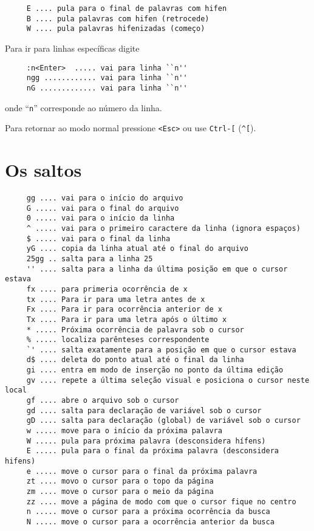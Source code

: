 \begin{verbatim}
     E .... pula para o final de palavras com hifen
     B .... pula palavras com hifen (retrocede)
     W .... pula palavras hifenizadas (começo)
\end{verbatim}



Para ir para linhas específicas digite

\begin{verbatim}
     :n<Enter>  ..... vai para linha ``n''
     ngg ............ vai para linha ``n''
     nG ............. vai para linha ``n''
\end{verbatim}

onde ``\verb|n|'' corresponde ao número da linha.

Para retornar ao modo normal pressione \verb|<Esc>| ou use \verb|Ctrl-[|
(\verb|^[|).

\section{Os saltos}\label{Os saltos}

\begin{verbatim}
     gg .... vai para o início do arquivo
     G ..... vai para o final do arquivo
     0 ..... vai para o início da linha
     ^ ..... vai para o primeiro caractere da linha (ignora espaços)
     $ ..... vai para o final da linha
     yG .... copia da linha atual até o final do arquivo
     25gg .. salta para a linha 25
     '' .... salta para a linha da última posição em que o cursor estava
     fx .... para primeria ocorrência de x
     tx .... Para ir para uma letra antes de x
     Fx .... Para ir para ocorrência anterior de x
     Tx .... Para ir para uma letra após o último x
     * ..... Próxima ocorrência de palavra sob o cursor
     % ..... localiza parênteses correspondente
     `' .... salta exatamente para a posição em que o cursor estava
     d$ .... deleta do ponto atual até o final da linha
     gi .... entra em modo de inserção no ponto da última edição
     gv .... repete a última seleção visual e posiciona o cursor neste local
     gf .... abre o arquivo sob o cursor
     gd .... salta para declaração de variável sob o cursor
     gD .... salta para declaração (global) de variável sob o cursor
     w ..... move para o início da próxima palavra
     W ..... pula para próxima palavra (desconsidera hífens)
     E ..... pula para o final da próxima palavra (desconsidera hifens)
     e ..... move o cursor para o final da próxima palavra
     zt .... movo o cursor para o topo da página
     zm .... move o cursor para o meio da página
     zz .... move a página de modo com que o cursor fique no centro
     n ..... move o cursor para a próxima ocorrência da busca
     N ..... move o cursor para a ocorrência anterior da busca
\end{verbatim}

